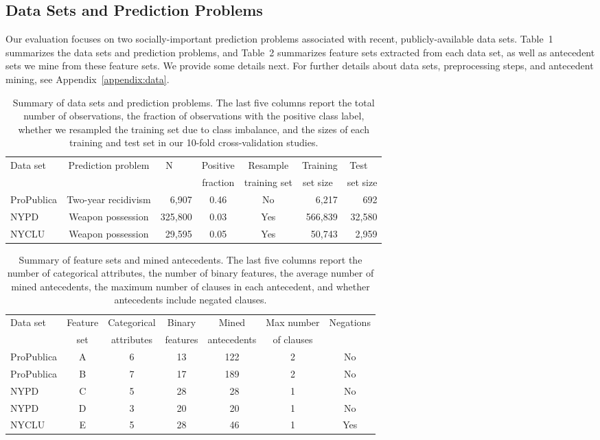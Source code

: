 \documentclass[twoside,11pt]{article}
\begin{document}
\subsection{Data Sets and Prediction Problems}
\label{sec:datasets}
Our evaluation focuses on two socially-important prediction problems associated
with recent, publicly-available data sets.
%
Table~1 summarizes the data sets and prediction problems,
and Table~2 summarizes feature sets extracted from each data set,
as well as antecedent sets we mine from these feature sets.
%
We provide some details next.
%
For further details about data sets, preprocessing steps, and antecedent mining,
see Appendix~\ref{appendix:data}.

\begin{table}[t!]
\centering
\begin{tabular}{l|c|r|c|c|r|r}
Data set & Prediction problem & N~~~~ & Positive & Resample & Training & Test~~ \\
& & & fraction & training set & set size~ & set size \\
\hline
ProPublica & Two-year recidivism & 6,907 & 0.46 & No & 6,217 & 692 \\
NYPD & Weapon possession & 325,800 & 0.03 & Yes & 566,839 & 32,580 \\
NYCLU & Weapon possession & 29,595 & 0.05 & Yes & 50,743 & 2,959 \\
\end{tabular}
\caption{Summary of data sets and prediction problems.
%
The last five columns report the total number of observations,
the fraction of observations with the positive class label,
whether we resampled the training set due to class imbalance,
and the sizes of each training and test set in our 10-fold cross-validation studies.
}
\label{tab:datasets}
\end{table}

\begin{table}[t!]
\centering
\begin{tabular}{l|c|c|c|c|c|c}
Data set & Feature & Categorical & Binary & Mined & Max number & Negations \\
& set & attributes & features & antecedents & of clauses & \\
\hline
ProPublica & A & 6 & 13 & 122 & 2 & No \\
ProPublica & B & 7 & 17 & 189 & 2 & No \\
NYPD & C & 5 & 28 & ~28 & 1 & No \\
NYPD & D & 3 & 20 & ~20 & 1 & No \\
NYCLU & E & 5 & 28 & ~46 & 1 & Yes
\end{tabular}
\caption{Summary of feature sets and mined antecedents.
%
The last five columns report the number of categorical attributes,
the number of binary features, the average number of mined antecedents,
the maximum number of clauses in each antecedent,
and whether antecedents include negated clauses.
}
\label{tab:features}
\end{table}
\end{document}
